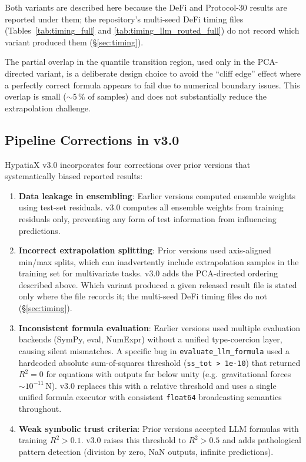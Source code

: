 \documentclass[twoside,11pt]{article}
\newcommand{\Rsq}{R^{2}}
\begin{document}
Both variants are described here because the DeFi and Protocol-30 results are
reported under them; the repository's multi-seed DeFi timing files
(Tables~\ref{tab:timing_full} and \ref{tab:timing_llm_routed_full}) do not
record which variant produced them (\S\ref{sec:timing}).

\begin{remark}
The partial overlap in the quantile transition region, used only in the
PCA-directed variant, is a deliberate design choice to avoid the ``cliff
edge'' effect where a perfectly correct formula appears to fail due to
numerical boundary issues. This overlap is small ($\sim$5\,\% of samples)
and does not substantially reduce the extrapolation challenge.
\end{remark}

\subsection{Pipeline Corrections in v3.0}\label{subsec:pipeline-corrections-in-v30}
\label{sec:r2_bugfix}
\label{sec:corrections}

HypatiaX v3.0 incorporates four corrections over prior versions that systematically
biased reported results:

\begin{enumerate}[leftmargin=2em,label=\arabic*.]
  \item \textbf{Data leakage in ensembling}: Earlier versions computed ensemble
    weights using test-set residuals.  v3.0 computes all ensemble weights from
    training residuals only, preventing any form of test information from
    influencing predictions.

  \item \textbf{Incorrect extrapolation splitting}: Prior versions used axis-aligned
    min/max splits, which can inadvertently include extrapolation samples in the
    training set for multivariate tasks.  v3.0 adds the PCA-directed ordering
    described above. Which variant produced a given released result file is
    stated only where the file records it; the multi-seed DeFi timing files do
    not (\S\ref{sec:timing}).

  \item \textbf{Inconsistent formula evaluation}: Earlier
    versions used multiple evaluation backends (SymPy, eval, NumExpr) without a
    unified type-coercion layer, causing silent mismatches.  A specific bug in
    \texttt{evaluate\_llm\_formula} used a hardcoded absolute sum-of-squares
    threshold (\texttt{ss\_tot > 1e-10}) that returned $\Rsq = 0$ for equations
    with outputs far below unity (e.g.\ gravitational forces $\sim 10^{-11}$\,N).
    v3.0 replaces this with a relative threshold and uses a single unified formula
    executor with consistent \texttt{float64} broadcasting semantics throughout.

  \item \textbf{Weak symbolic trust criteria}: Prior versions accepted LLM formulas
    with training $\Rsq > 0.1$.  v3.0 raises this threshold to $\Rsq > 0.5$ and
    adds pathological pattern detection (division by zero, NaN outputs, infinite
    predictions).
\end{enumerate}
\end{document}
